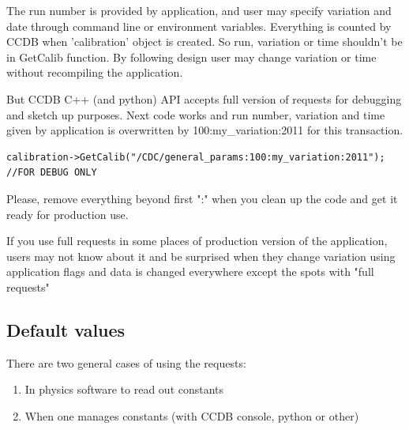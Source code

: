 \documentclass{article}
\begin{document}
The run number is provided by application, and user may specify variation and date
through command line or environment variables. Everything is counted by CCDB when
 'calibration' object is created. So run, variation or time shouldn't be in GetCalib function. By following design user may change variation or time without recompiling the application.

 
But CCDB C++ (and python) API accepts full version of requests for debugging and  sketch up purposes. Next code works and run number, variation and time given by application is overwritten by 100:my\_variation:2011 for this transaction. 
\begin{verbatim}
calibration->GetCalib("/CDC/general_params:100:my_variation:2011"); //FOR DEBUG ONLY
\end{verbatim}
Please, remove everything beyond first ":" when you clean up the code and get it ready for production use.

If you use full requests in some places of production version of the application, users may not know about it and be surprised when they change variation using application flags and data is changed everywhere except the spots with "full requests"


%
%




\subsection{Default values}

There are two general cases of using the requests:
\begin{enumerate}
  \item In physics software to read out constants
  \item When one manages constants (with CCDB console, python or other)
\end{enumerate}
\vspace{1 em}
\end{document}
